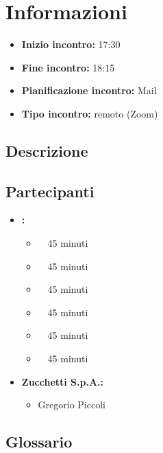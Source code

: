 \section{Informazioni}
\begin{itemize}
	\item \textbf{Inizio incontro:} 17:30
	\item \textbf{Fine incontro:} 18:15
	\item \textbf{Pianificazione incontro:} Mail
	\item \textbf{Tipo incontro:} remoto (Zoom)
\end{itemize}

\subsection{Descrizione}
\DocDescription

\subsection{Partecipanti}

\begin{itemize}
	\item \textbf{\GroupName:}
	\begin{itemize}
		\item \tommaso \ \rightarrow\ 45 minuti
		\item \marco \ \rightarrow\ 45 minuti
		\item \riccardo \ \rightarrow\ 45 minuti
		\item \raul \ \rightarrow\ 45 minuti
		\item \martina \ \rightarrow\ 45 minuti
		\item \sebastiano \ \rightarrow\ 45 minuti
	\end{itemize}
	\item \textbf{Zucchetti S.p.A.:}
    \begin{itemize}
        \item Gregorio Piccoli
    \end{itemize}
\end{itemize}

\subsection{Glossario}
\GlossarioIntroduzione

\clearpage